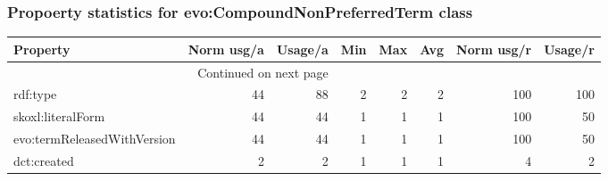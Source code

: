 \documentclass[10pt,a4paper,titlepage,final]{article}
\begin{document}
\subsubsection{Propoerty statistics for evo:CompoundNonPreferredTerm class}
\begin{longtable}{lrrrrrrr}
\toprule
                    Property &  Norm usg/a &  Usage/a &  Min &  Max &  Avg &  Norm usg/r &  Usage/r \\
\midrule
\endhead
\midrule
\multicolumn{3}{r}{{Continued on next page}} \\
\midrule
\endfoot

\bottomrule
\endlastfoot
                    rdf:type &          44 &       88 &    2 &    2 &    2 &         100 &      100 \\
           skoxl:literalForm &          44 &       44 &    1 &    1 &    1 &         100 &       50 \\
 evo:termReleasedWithVersion &          44 &       44 &    1 &    1 &    1 &         100 &       50 \\
                 dct:created &           2 &        2 &    1 &    1 &    1 &           4 &        2 \\
\end{longtable}
\end{document}
